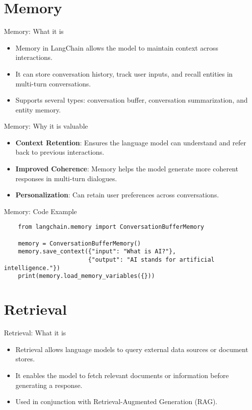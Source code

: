 \documentclass{beamer}
\begin{document}
\section{Memory}

\begin{frame}{Memory: What it is}
    \begin{itemize}
        \item Memory in LangChain allows the model to maintain context across interactions.
        \item It can store conversation history, track user inputs, and recall entities in multi-turn conversations.
        \item Supports several types: conversation buffer, conversation summarization, and entity memory.
    \end{itemize}
\end{frame}

\begin{frame}{Memory: Why it is valuable}
    \begin{itemize}
        \item \textbf{Context Retention}: Ensures the language model can understand and refer back to previous interactions.
        \item \textbf{Improved Coherence}: Memory helps the model generate more coherent responses in multi-turn dialogues.
        \item \textbf{Personalization}: Can retain user preferences across conversations.
    \end{itemize}
\end{frame}

\begin{frame}[fragile]{Memory: Code Example}
    \begin{verbatim}
    from langchain.memory import ConversationBufferMemory

    memory = ConversationBufferMemory()
    memory.save_context({"input": "What is AI?"},
                        {"output": "AI stands for artificial intelligence."})
    print(memory.load_memory_variables({}))
    \end{verbatim}
\end{frame}

\section{Retrieval}

\begin{frame}{Retrieval: What it is}
    \begin{itemize}
        \item Retrieval allows language models to query external data sources or document stores.
        \item It enables the model to fetch relevant documents or information before generating a response.
        \item Used in conjunction with Retrieval-Augmented Generation (RAG).
    \end{itemize}
\end{frame}
\end{document}
